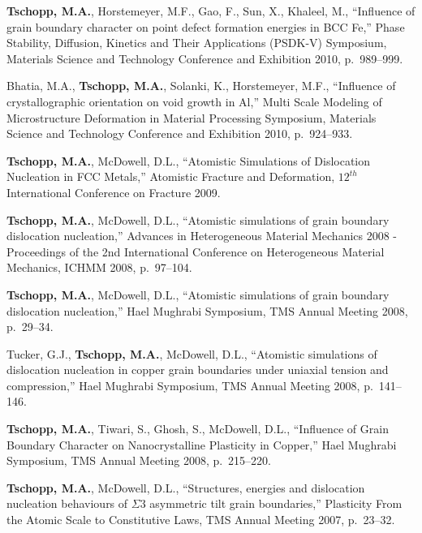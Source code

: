 \begin{cvlist}
\item
\textbf{Tschopp, M.A.}, Horstemeyer, M.F., Gao, F., Sun, X., Khaleel, M., ``Influence of grain boundary character on point defect formation energies in BCC Fe,'' Phase Stability, Diffusion, Kinetics and Their Applications (PSDK-V) Symposium, Materials Science and Technology Conference and Exhibition 2010, p.~989--999.

\item
{Bhatia, M.A.}, \textbf{Tschopp, M.A.}, Solanki, K., Horstemeyer, M.F., ``Influence of crystallographic orientation on void growth in Al,'' Multi Scale Modeling of Microstructure Deformation in Material Processing Symposium, Materials Science and Technology Conference and Exhibition 2010, p.~924--933.

\item 
\textbf{Tschopp, M.A.}, McDowell, D.L., ``Atomistic Simulations of Dislocation Nucleation in FCC Metals,'' Atomistic Fracture and Deformation, $12^{th}$ International Conference on Fracture 2009.

\item 
\textbf{Tschopp, M.A.}, McDowell, D.L., ``Atomistic simulations of grain boundary dislocation nucleation,'' Advances in Heterogeneous Material Mechanics 2008 - Proceedings of the 2nd International Conference on Heterogeneous Material Mechanics, ICHMM 2008, p.~97--104.

\item 
\textbf{Tschopp, M.A.}, McDowell, D.L., ``{Atomistic simulations of grain boundary dislocation nucleation},'' Hael Mughrabi Symposium, TMS Annual Meeting 2008, p.~29--34.

\item 
Tucker, G.J., \textbf{Tschopp, M.A.}, McDowell, D.L., ``Atomistic simulations of dislocation nucleation in copper grain boundaries under uniaxial tension and compression,'' Hael Mughrabi Symposium, TMS Annual Meeting 2008, p.~141--146.

\item 
\textbf{Tschopp, M.A.}, Tiwari, S., Ghosh, S., McDowell, D.L., ``{Influence of Grain Boundary Character on Nanocrystalline Plasticity in Copper},'' Hael Mughrabi Symposium, TMS Annual Meeting 2008, p.~215--220.

\item 
\textbf{Tschopp, M.A.}, McDowell, D.L., ``{Structures, energies and dislocation nucleation behaviours of $\Sigma3$ asymmetric tilt grain boundaries},'' Plasticity From the Atomic Scale to Constitutive Laws, TMS Annual Meeting 2007, p.~23--32.


\end{cvlist}
